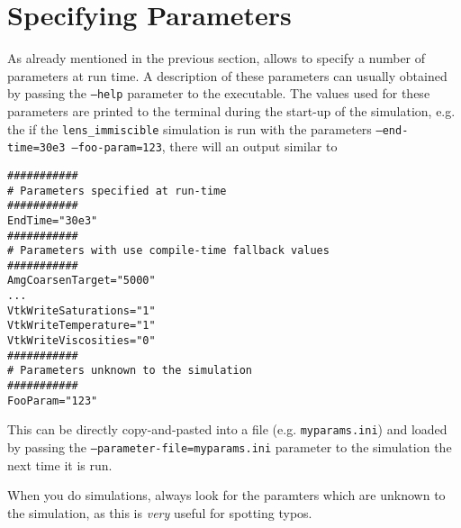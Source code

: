 \section{Specifying Parameters}
\label{sec:inputFiles}

As already mentioned in the previous section, \eWoms allows to specify
a number of parameters at run time. A description of these parameters
can usually obtained by passing the \texttt{--help} parameter to the
executable. The values used for these parameters are printed to the
terminal during the start-up of the simulation, e.g. the if the \texttt{lens\_immiscible}
simulation is run with the parameters \texttt{--end-time=30e3 --foo-param=123}, there will an output similar to
\begin{lstlisting}[style=Bash]
###########
# Parameters specified at run-time
###########
EndTime="30e3"
###########
# Parameters with use compile-time fallback values
###########
AmgCoarsenTarget="5000"
...
VtkWriteSaturations="1"
VtkWriteTemperature="1"
VtkWriteViscosities="0"
###########
# Parameters unknown to the simulation
###########
FooParam="123"
\end{lstlisting}

This can be directly copy-and-pasted into a file
(e.g. \texttt{myparams.ini}) and loaded by passing the
\texttt{--parameter-file=myparams.ini} parameter to the simulation the
next time it is run.

When you do simulations, always look for the paramters which are
unknown to the simulation, as this is \emph{very} useful for spotting
typos.

